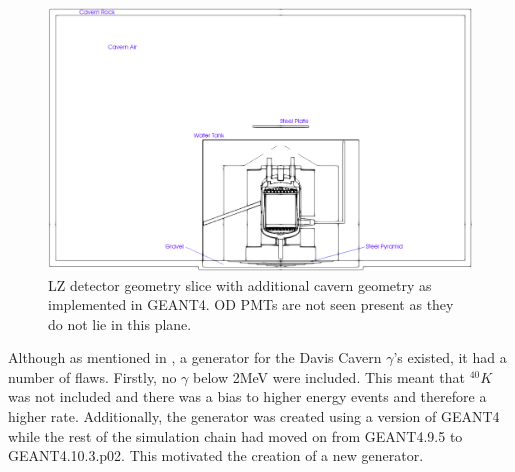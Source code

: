 \begin{figure}[!htbp]
\includegraphics[width=\textwidth]{Figures/Geometry/cavern_geometry_with_markings.png}
\centering
\caption{LZ detector geometry slice with additional cavern geometry as implemented in GEANT4. OD PMTs are not seen present as they do not lie in this plane.}
\label{fig:Cavern_Geometry}
\end{figure}

\par
Although as mentioned in \cite{lz_simulations_ref}, a generator for the Davis Cavern $\gamma$'s existed, it had a number of flaws.
Firstly, no $\gamma$ below 2MeV were included.
This meant that $^{40}K$ was not included and there was a bias to higher energy events and therefore a higher rate.
Additionally, the generator was created using a version of GEANT4 while the rest of the simulation chain had moved on from GEANT4.9.5 to GEANT4.10.3.p02. 
This motivated the creation of a new generator.

